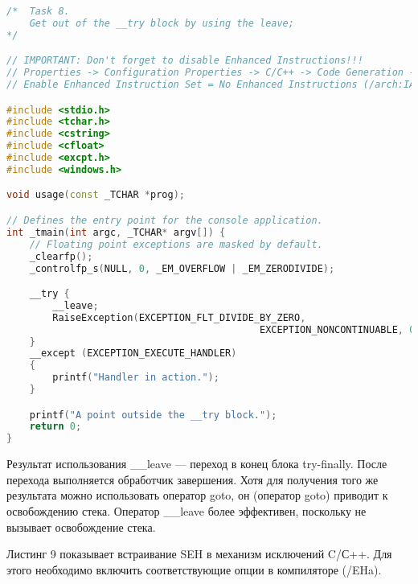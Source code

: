 \documentclass[a4paper,12pt]{article} %
\begin{document}
\begin{lstlisting}[language=C++, caption={Выход из блока охраняемого кода при помощи \_\_leave}]
/*  Task 8.
	Get out of the __try block by using the leave;
*/

// IMPORTANT: Don't forget to disable Enhanced Instructions!!!
// Properties -> Configuration Properties -> C/C++ -> Code Generation ->
// Enable Enhanced Instruction Set = No Enhanced Instructions (/arch:IA32)

#include <stdio.h>
#include <tchar.h>
#include <cstring>
#include <cfloat>
#include <excpt.h>
#include <windows.h>

void usage(const _TCHAR *prog);

// Defines the entry point for the console application.
int _tmain(int argc, _TCHAR* argv[]) {
	// Floating point exceptions are masked by default.
	_clearfp();
	_controlfp_s(NULL, 0, _EM_OVERFLOW | _EM_ZERODIVIDE);

	__try {
		__leave;
		RaiseException(EXCEPTION_FLT_DIVIDE_BY_ZERO,
											EXCEPTION_NONCONTINUABLE, 0, NULL);
	}
	__except (EXCEPTION_EXECUTE_HANDLER)
	{
		printf("Handler in action.");
	}

	printf("A point outside the __try block.");
	return 0;
}
\end{lstlisting}

Результат использования \_\_leave — переход в конец блока try-finally. После перехода выполняется обработчик завершения. Хотя для получения того же результата можно использовать оператор goto, он (оператор goto) приводит к освобождению стека. Оператор \_\_leave более эффективен, поскольку не вызывает освобождение стека.
\newpage

Листинг 9 показывает встраивание SEH в механизм исключений C/С++. Для этого необходимо включить соответствующие опции в компиляторе (/EHa).
\end{document}
